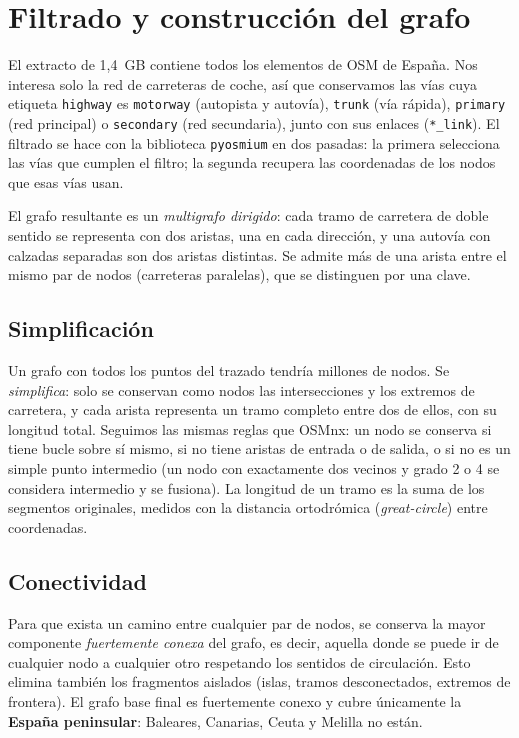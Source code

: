 \section{Filtrado y construcción del grafo}\label{sec:construccion}

El extracto de 1,4~GB contiene todos los elementos de OSM de España. Nos interesa solo la red de carreteras de coche, así que conservamos las vías cuya etiqueta
\texttt{highway} es \texttt{motorway} (autopista y autovía), \texttt{trunk} (vía rápida), \texttt{primary} (red principal) o \texttt{secondary} (red secundaria), junto con sus
enlaces (\texttt{*\_link}). El filtrado se hace con la biblioteca \texttt{pyosmium} en dos pasadas: la primera selecciona las vías que cumplen el filtro; la segunda recupera las coordenadas de los nodos que esas vías usan.

El grafo resultante es un \emph{multigrafo dirigido}: cada tramo de carretera de doble sentido se representa con dos aristas, una en cada dirección, y una autovía con
calzadas separadas son dos aristas distintas. Se admite más de una arista entre el mismo par de nodos (carreteras paralelas), que se distinguen por una clave.

\subsection{Simplificación}

Un grafo con todos los puntos del trazado tendría millones de nodos. Se \emph{simplifica}: solo se conservan como nodos las intersecciones y los extremos de carretera, y cada arista
representa un tramo completo entre dos de ellos, con su longitud total. Seguimos las mismas reglas que OSMnx: un nodo se conserva si tiene bucle sobre sí mismo, si no tiene aristas
de entrada o de salida, o si no es un simple punto intermedio (un nodo con exactamente dos vecinos y grado 2 o 4 se considera intermedio y se fusiona). La longitud de un tramo es la suma de los segmentos
originales, medidos con la distancia ortodrómica (\emph{great-circle}) entre coordenadas.

\subsection{Conectividad}

Para que exista un camino entre cualquier par de nodos, se conserva la mayor componente \emph{fuertemente conexa} del grafo, es decir, aquella donde se puede ir de cualquier nodo a cualquier otro respetando
los sentidos de circulación. Esto elimina también los fragmentos aislados (islas, tramos desconectados, extremos de frontera). El grafo base final es fuertemente conexo y cubre únicamente la
\textbf{España peninsular}: Baleares, Canarias, Ceuta y Melilla no están.

